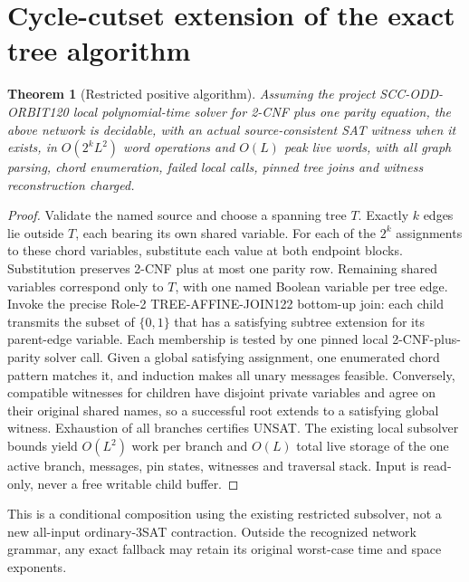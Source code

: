 \documentclass[11pt]{article}
\newtheorem{theorem}{Theorem}
\begin{document}
\section{Cycle-cutset extension of the exact tree algorithm}
\begin{theorem}[Restricted positive algorithm]
Assuming the project SCC-ODD-ORBIT120 local polynomial-time solver for 2-CNF plus one parity equation, the above network is decidable, with an actual source-consistent SAT witness when it exists, in $O(2^k L^2)$ word operations and $O(L)$ peak live words, with all graph parsing, chord enumeration, failed local calls, pinned tree joins and witness reconstruction charged.
\end{theorem}
\begin{proof}
Validate the named source and choose a spanning tree $T$. Exactly $k$ edges lie outside $T$, each bearing its own shared variable. For each of the $2^k$ assignments to these chord variables, substitute each value at both endpoint blocks. Substitution preserves 2-CNF plus at most one parity row. Remaining shared variables correspond only to $T$, with one named Boolean variable per tree edge. Invoke the precise Role-2 TREE-AFFINE-JOIN122 bottom-up join: each child transmits the subset of $\{0,1\}$ that has a satisfying subtree extension for its parent-edge variable. Each membership is tested by one pinned local 2-CNF-plus-parity solver call. Given a global satisfying assignment, one enumerated chord pattern matches it, and induction makes all unary messages feasible. Conversely, compatible witnesses for children have disjoint private variables and agree on their original shared names, so a successful root extends to a satisfying global witness. Exhaustion of all branches certifies UNSAT. The existing local subsolver bounds yield $O(L^2)$ work per branch and $O(L)$ total live storage of the one active branch, messages, pin states, witnesses and traversal stack. Input is read-only, never a free writable child buffer.
\end{proof}
This is a conditional composition using the existing restricted subsolver, not a new all-input ordinary-3SAT contraction. Outside the recognized network grammar, any exact fallback may retain its original worst-case time and space exponents.
\end{document}
